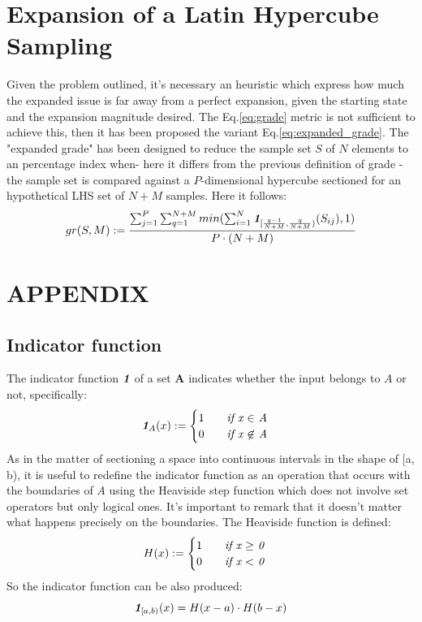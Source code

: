 \documentclass[12pt]{article}
\newcommand{\meqref}[1]{Eq.\ref{#1}}
\newcommand{\indfunc}[1]{\textit{\textbf{1}}_{#1}}
\begin{document}
\section{Expansion of a Latin Hypercube Sampling}
\label{sec:lhs_expansion}

Given the problem outlined, it's necessary an heuristic which express how much the expanded issue is far away from a perfect expansion, given the starting state and the expansion magnitude desired. The \meqref{eq:grade} metric is not sufficient to achieve this, then it has been proposed the variant \meqref{eq:expanded_grade}. 
The "expanded grade" has been designed to reduce the sample set $S$ of $N$ elements to an percentage index when- here it differs from the previous definition of grade - the sample set is compared against a $P$-dimensional hypercube sectioned for an hypothetical LHS set of $N + M$ samples. Here it follows:
\begin{equation}
\label{eq:expanded_grade}
gr(S, M) := \frac{\sum^P_{j=1}\sum^{N + M}_{q=1} min(\sum^N_{i=1}\indfunc{[\frac{q-1}{N + M}, \frac{q}{N + M})}(S_{ij}), 1)}{P \cdot (N + M)}
\end{equation}


\section{APPENDIX}
\subsection{Indicator function}
\label{appendix:indicator_function}
The indicator function $\indfunc{}$ of a set \textbf{A} indicates whether the input belongs  to $A$ or not, specifically:
\begin{equation}
\label{eq:indicator_function}
\indfunc{A}(x) := 
\begin{cases}
1 \qquad \text{\textit{if x $\in$ A}}\\
0 \qquad \text{\textit{if x $\not\in$ A}}
 \end{cases}
\end{equation}
As in the matter of sectioning a space into continuous intervals in the shape of [a, b), it is useful to redefine the indicator function as an operation that occurs with the boundaries of $A$ using the Heaviside step function which does not involve set operators but only logical ones. It's important to remark that it doesn't matter what happens precisely on the boundaries. 
The Heaviside function is defined:
\begin{equation}
\label{eq:heaviside}
H(x) := 
\begin{cases}
1 \qquad \text{\textit{if x $\geq$ 0}}\\
0 \qquad \text{\textit{if x $<$ 0}}
\end{cases}
\end{equation}
So the indicator function can be also produced:
\begin{equation}
\label{eq:indicator_function_with_h}
\indfunc{[a,b)}(x) = H(x - a) \cdot H(b - x)
\end{equation}
\end{document}
